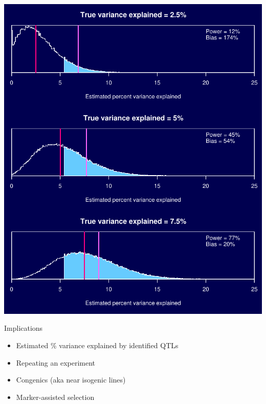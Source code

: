 \documentclass[12pt]{article}
\newcommand{\headsize}{\fontsize{35}{35} \selectfont}
\newcommand{\smallsize}{\fontsize{25}{30} \selectfont}
\begin{document}
\begin{minipage}[t]{5.3in}
\vspace*{0mm}

\includegraphics{Figs/selbias.pdf}
\end{minipage}

\newpage

\headsize \color{myyellow}
\hfill \begin{minipage}{5.75in}
\centering
Implications
\end{minipage}

\smallsize \color{mywhite}

\vspace{25mm}

\hfill
\begin{minipage}{10in}
\begin{itemize}
\setlength{\itemsep}{24pt}
\item Estimated \% variance explained by identified QTLs

\item Repeating an experiment

\item Congenics (aka near isogenic lines)

\item Marker-assisted selection
\end{itemize}
\end{minipage}
\end{document}
